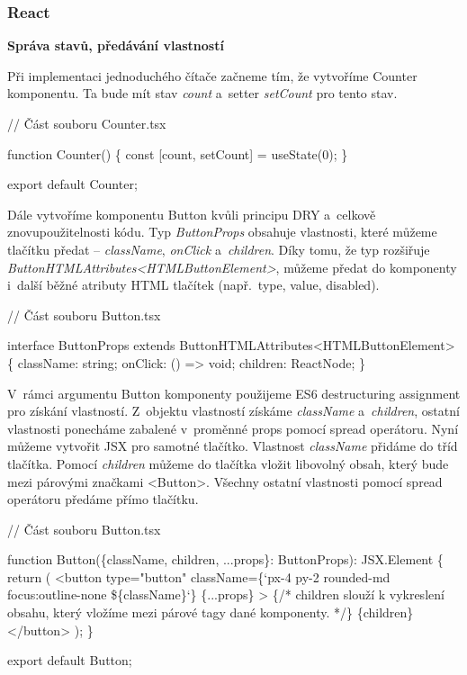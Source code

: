 \subsubsection{React}

\begin{flushleft}
  \textbf{Správa stavů, předávání vlastností}
\end{flushleft}

Při implementaci jednoduchého čítače začneme tím, že vytvoříme Counter komponentu. Ta bude mít stav \emph{count} a~setter \emph{setCount} pro tento stav.

\begin{prog}
// Část souboru Counter.tsx

function Counter() \{
  const [count, setCount] = useState(0);
\}

export default Counter;
\end{prog}

Dále vytvoříme komponentu Button kvůli principu DRY a~celkově znovupoužitelnosti kódu. 
Typ \emph{ButtonProps} obsahuje vlastnosti, které můžeme tlačítku předat -- \emph{className}, \emph{onClick} a~\emph{children}. 
Díky tomu, že typ rozšiřuje \emph{ButtonHTMLAttributes<HTMLButtonElement>}, můžeme předat do komponenty i~další běžné atributy HTML tlačítek (např.~type, value, disabled).

\begin{prog}
// Část souboru Button.tsx

interface ButtonProps extends ButtonHTMLAttributes<HTMLButtonElement> \{
  className: string;
  onClick: () => void;
  children: ReactNode;
\}
\end{prog}

V~rámci argumentu Button komponenty použijeme ES6 destructuring assignment pro získání vlastností. 
Z~objektu vlastností získáme \emph{className} a~\emph{children}, ostatní vlastnosti ponecháme zabalené v~proměnné props pomocí spread operátoru. 
Nyní můžeme vytvořit JSX pro samotné tlačítko. Vlastnost \emph{className} přidáme do tříd tlačítka. 
Pomocí \emph{children} můžeme do tlačítka vložit libovolný obsah, který bude mezi párovými značkami <Button>. 
Všechny ostatní vlastnosti pomocí spread operátoru předáme přímo tlačítku.

\begin{prog}
// Část souboru Button.tsx

function Button(\{className, children, ...props\}: ButtonProps): JSX.Element \{
  return (
    <button
      type="button"
      className=\{`px-4 py-2 rounded-md focus:outline-none \$\{className\}`\}
      \{...props\}
    >
      \{/* children slouží k vykreslení obsahu, 
        který vložíme mezi párové tagy dané komponenty. */\}
      \{children\}
    </button>
  );
\}

export default Button;
\end{prog}


